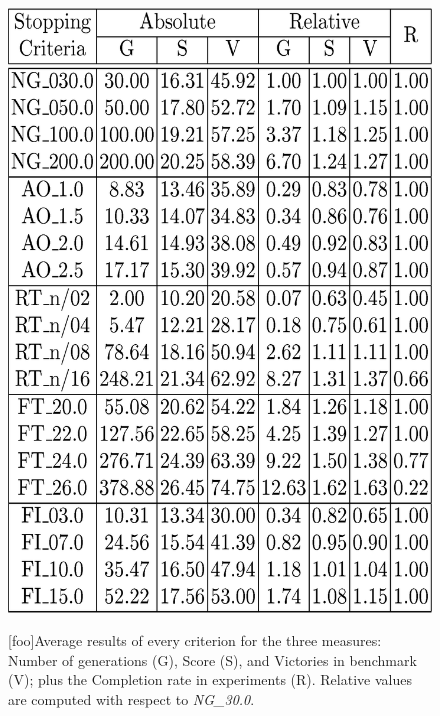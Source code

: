 \documentclass[runningheads,a4paper]{llncs}
\begin{document}
\begin{figure}[h!tb]
\begin{minipage}[b]{.44\columnwidth}
\includegraphics[width=1\columnwidth]{imags/tabla.eps}

[foo]{Average results of every criterion for the three measures: Number of generations (G), Score (S), and  Victories in benchmark (V); plus the Completion rate in experiments (R). Relative values are computed with respect to \textit{NG\_30.0}.}
\label{fig:table}
\end{minipage}
\end{figure}

\end{document}
